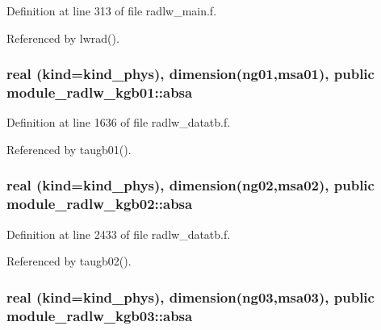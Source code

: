 Definition at line 313 of file radlw\+\_\+main.\+f.



Referenced by lwrad().

\subsubsection[{\texorpdfstring{absa}{absa}}]{\setlength{\rightskip}{0pt plus 5cm}real (kind=kind\+\_\+phys), dimension(ng01,msa01), public module\+\_\+radlw\+\_\+kgb01\+::absa}\hypertarget{group__module__radlw__main_gacdbe767d50d503c4a89d4042dd0dee8e}{}\label{group__module__radlw__main_gacdbe767d50d503c4a89d4042dd0dee8e}


Definition at line 1636 of file radlw\+\_\+datatb.\+f.



Referenced by taugb01().

\subsubsection[{\texorpdfstring{absa}{absa}}]{\setlength{\rightskip}{0pt plus 5cm}real (kind=kind\+\_\+phys), dimension(ng02,msa02), public module\+\_\+radlw\+\_\+kgb02\+::absa}\hypertarget{group__module__radlw__main_ga46db893d4456b2d867130bb208cb2206}{}\label{group__module__radlw__main_ga46db893d4456b2d867130bb208cb2206}


Definition at line 2433 of file radlw\+\_\+datatb.\+f.



Referenced by taugb02().

\subsubsection[{\texorpdfstring{absa}{absa}}]{\setlength{\rightskip}{0pt plus 5cm}real (kind=kind\+\_\+phys), dimension(ng03,msa03), public module\+\_\+radlw\+\_\+kgb03\+::absa}\hypertarget{group__module__radlw__main_gac65fd4afedbd4bfa2c87c5e4f060a1d4}{}\label{group__module__radlw__main_gac65fd4afedbd4bfa2c87c5e4f060a1d4}


